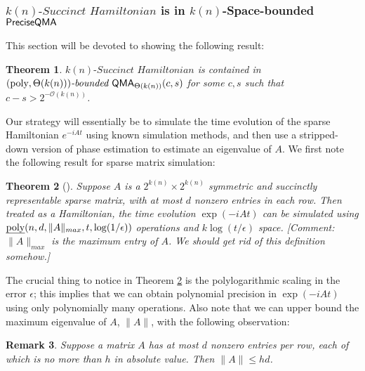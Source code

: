 \documentclass[11pt]{article}
\newtheorem{theorem}{Theorem}
\newtheorem{remark}[theorem]{Remark}
\theoremstyle{definition}
\theoremstyle{remark}
\newcommand\QMA{{\sf{QMA}}}
\newcommand\QMAexp{\sf{PreciseQMA}}
\newcommand\bddQMA[5]{{\left(#1,#2\right)}\textit{-bounded }\QMA_{#3}(#4,#5)}
\newcommand\spechamiltonian[1]{#1\textit{-Succinct Hamiltonian}}
\newcommand{\poly}{\textrm{poly}}
\begin{document}
\subsubsection{$\spechamiltonian{k(n)}$ is in $k(n)$-Space-bounded $\QMAexp$}\label{subsec:specham-in-bddqma}
This section will be devoted to showing the following result:
\begin{theorem} \label{lem:qma protocol}
$\spechamiltonian{k(n)}$ is contained in $\bddQMA{\poly}{\Theta(k(n))}{\Theta(k(n))}{c}{s}$ for some $c,s$ such that $c - s > 2^{-\mathcal{O}(k(n))}$.
\end{theorem}
Our strategy will essentially be to simulate the time evolution of the sparse Hamiltonian $e^{-iAt}$ using known simulation methods, and then use a stripped-down version of phase estimation to estimate an eigenvalue of $A$. We first note the following result for sparse matrix simulation:
\begin{theorem}[\cite{berry14,berry15}] \label{thm:ham_sim}
Suppose $A$ is a $2^{k(n)} \times 2^{k(n)}$ symmetric and succinctly representable sparse matrix, with at most $d$ nonzero entries in each row. Then treated as a Hamiltonian, the time evolution $\exp(-iAt)$ can be simulated using $\text{\emph{poly}}(n,d,\|A\|_{max}, t, \log(1/\epsilon))$ operations and $k\log(t/\epsilon)$ space.
[Comment: $\|A\|_{max}$ is the maximum entry of $A$. We should get rid of this definition somehow.]
\end{theorem}
The crucial thing to notice in Theorem \ref{thm:ham_sim} is the polylogarithmic scaling in the error $\epsilon$; this implies that we can obtain polynomial precision in $\exp(-iAt)$ using only polynomially many operations. Also note that we can upper bound the maximum eigenvalue of $A$, $\|A\|$, with the following observation:
\begin{remark}
Suppose a matrix $A$ has at most $d$ nonzero entries per row, each of which is no more than $h$ in absolute value. Then $\| A \| \le hd$.
\end{remark}
\end{document}

